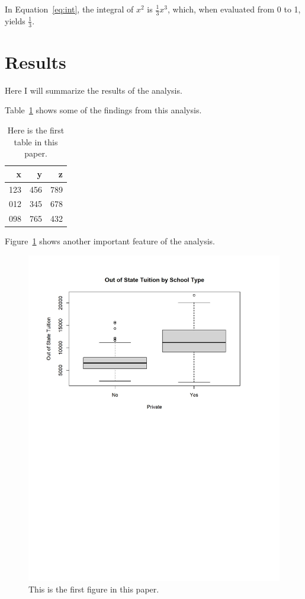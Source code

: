 \documentclass[12pt]{article}
\begin{document}
In Equation~\eqref{eq:int}, the integral of $x^2$ is $\frac{1}{3}x^3$, which, when evaluated from 0 to 1, yields $\frac{1}{3}$.

\section{Results}
\label{sec:resu}

Here I will summarize the results of the analysis.

\lipsum[3]

Table~\ref{tab:tabl} shows some of the findings from this analysis.

\begin{table}[tbp]
\caption{Here is the first table in this paper.}
\label{tab:tabl}
\centering
\begin{tabular}{rrr}
\toprule
x & y & z \\
\midrule
123 & 456 & 789 \\
012 & 345 & 678 \\
098 & 765 & 432 \\
\bottomrule
\end{tabular}
\end{table}

Figure~\ref{fig:figu} shows another important feature of the analysis.

\begin{figure}[tbp]
    \centering
    \includegraphics[width=\textwidth]{Practicing LaTeX Example Figure.pdf}
    \caption{This is the first figure in this paper.}
    \label{fig:figu}
\end{figure}
\end{document}
